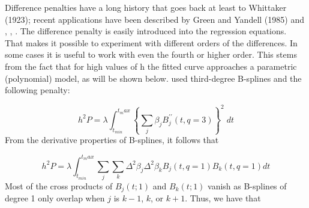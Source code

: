 \documentclass[12pt]{article}
\newcommand*\needsparaphrased{\color{red}}
\begin{document}
{ \needsparaphrased Difference penalties have a long history that goes back at least to Whittaker (1923); recent applications have been described by Green and Yandell (1985) and \cite{eilers1991penalized}, \cite{eilers1991nonparametric}, \cite{eilers1995indirect}. The difference penalty is easily introduced into the regression equations. That makes it possible to experiment with different orders of the differences. In some cases it is useful to work with even the fourth or higher order. This stems from the fact that for high values of h the fitted curve approaches a parametric (polynomial) model, as will be shown below.
\cite{o1986statistical} used third-degree B-splines and the following penalty:}

\begin{equation} \label{eq:osullivan_univariate_bspline_penalty}
h^2 P = \lambda \int_{t_{min}}^{t_max} \left\{ \sum_{j}  \beta_j B_j^{\prime \prime} \left(t, q=3\right) \right\}^2\; dt
\end{equation}
\noindent
From the derivative properties of B-splines, it follows that

\begin{equation} \label{osullivan_univariate_bspline_penalty_via_deriv}
h^2 P = \lambda \int_{t_{min}}^{t_max}  \sum_{j} \sum_{k} \Delta^2 \beta_j \Delta^2 \beta_k B_j\left(t,q=1\right)B_k\left(t,q=1\right) dt 
\end{equation}
\noindent
Most of the cross products of $B_j(t; 1)$ and $B_k(t;1)$ vanish as B-splines of degree 1 only overlap when $j$ is $k-1$, $k$, or $k+1$. Thus, we have that
\end{document}
